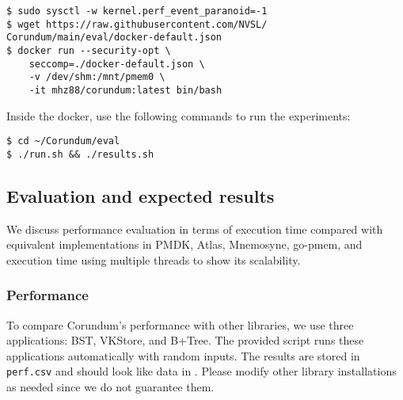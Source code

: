 {\begin{verbatim}
$ sudo sysctl -w kernel.perf_event_paranoid=-1
$ wget https://raw.githubusercontent.com/NVSL/
Corundum/main/eval/docker-default.json
$ docker run --security-opt \
    seccomp=./docker-default.json \
    -v /dev/shm:/mnt/pmem0 \
    -it mhz88/corundum:latest bin/bash
\end{verbatim}

\noindent
Inside the docker, use the following commands to run the experiments:

\begin{verbatim}
$ cd ~/Corundum/eval
$ ./run.sh && ./results.sh
\end{verbatim}

\subsection{Evaluation and expected results}

We discuss performance evaluation in terms of execution time compared with equivalent implementations in PMDK, Atlas, Mnemosyne, go-pmem, and execution time using multiple threads to show its scalability. 

\subsubsection{Performance}

To compare Corundum's performance with other libraries, we use three applications: BST, VKStore, and B+Tree. The provided script runs these applications automatically with random inputs. The results are stored in \verb+perf.csv+ and should look like data in . Please modify other library installations as needed since we do not guarantee them.

}
